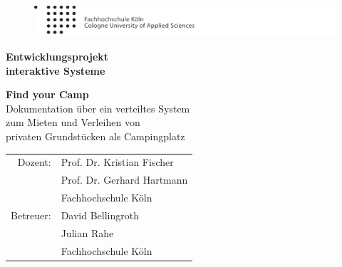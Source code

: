 
\begin{titlepage}

\begin{center}

\begin{figure}[!ht]
	\centering
		\includegraphics[natwidth=920pt, natheight=95pt, width=1.0\textwidth]{inc/logoheader.pdf}
\end{figure}

\vspace{4.0cm}

\begin{Huge}
	\textbf{Entwicklungsprojekt }\\
	\vspace{0.1cm}
	\textbf{interaktive Systeme}\\
	
\end{Huge}

\vspace{0.8cm}

\begin{LARGE}
	\textbf{Find your Camp}\\
	\vspace{0.2cm}
	Dokumentation über ein verteiltes System\\
	\vspace{0.1cm}
	zum Mieten und Verleihen von \\
	\vspace{0.1cm}
	privaten Grundstücken als Campingplatz\\
\end{LARGE}

\vspace{2cm}

\begin{tabular}{rl}
        Dozent:  &  Prof. Dr. Kristian Fischer\\
       		 	 &  Prof. Dr. Gerhard Hartmann\\
       			 &  \small Fachhochschule Köln \\[1.0em]
      Betreuer:  &  David Bellingroth\\
				 &  Julian Rahe\\
       			 &  \small Fachhochschule Köln\\
\end{tabular}


\end{center}
\end{titlepage}
